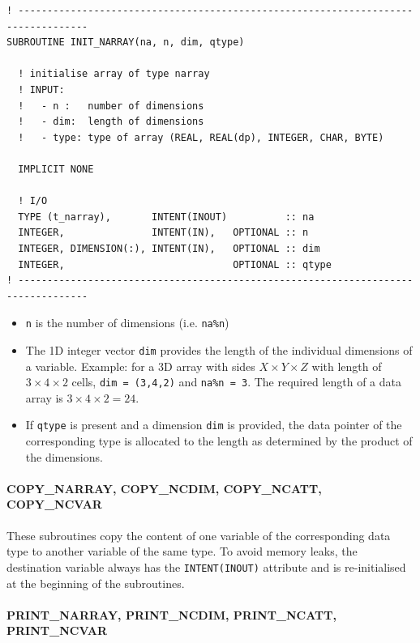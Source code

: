 \documentclass[11pt,twoside]{article}
\begin{document}
\begin{verbatim}
! ----------------------------------------------------------------------------------
SUBROUTINE INIT_NARRAY(na, n, dim, qtype)

  ! initialise array of type narray
  ! INPUT:
  !   - n :   number of dimensions
  !   - dim:  length of dimensions
  !   - type: type of array (REAL, REAL(dp), INTEGER, CHAR, BYTE)
  
  IMPLICIT NONE

  ! I/O
  TYPE (t_narray),       INTENT(INOUT)          :: na
  INTEGER,               INTENT(IN),   OPTIONAL :: n
  INTEGER, DIMENSION(:), INTENT(IN),   OPTIONAL :: dim
  INTEGER,                             OPTIONAL :: qtype
! ----------------------------------------------------------------------------------
\end{verbatim}
\begin{itemize}
\item \verb|n| is the number of dimensions (i.e. \verb|na%n|)
\item The 1D integer vector \verb|dim| provides the length of the individual
 dimensions of a variable. Example: for a 3D array with sides  $X \times
 Y \times Z$ with length of $3 \times 4 \times 2$ cells, 
\verb|dim = (3,4,2)| and \verb|na%n = 3|. The  
required length of a data array is $3 \times 4 \times 2=24$.

\item If \verb|qtype| is present and a dimension \verb|dim| is provided, the
 data pointer of the corresponding type is allocated to the length as
 determined by the product of the dimensions.
\end{itemize}


\paragraph{COPY\_NARRAY, COPY\_NCDIM, COPY\_NCATT, COPY\_NCVAR\\\label{COPYNC}}

These subroutines copy the content of one variable of the corresponding
data type to another variable of the same type.
 To  avoid memory leaks, the destination
variable always has the \verb|INTENT(INOUT)| attribute and is
re-initialised at the beginning of the subroutines.

\paragraph{PRINT\_NARRAY, PRINT\_NCDIM, PRINT\_NCATT, PRINT\_NCVAR\\\label{PRINTNC}}
\end{document}
